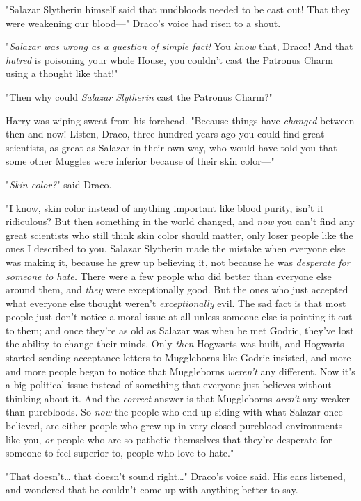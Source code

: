 "Salazar Slytherin himself said that mudbloods needed to be cast out! That they 
were weakening our blood---" Draco's voice had risen to a shout.

"\emph{Salazar was wrong as a question of simple fact!} You \emph{know} that, 
Draco! And that \emph{hatred} is poisoning your whole House, you couldn't cast 
the Patronus Charm using a thought like that!"

"Then why could \emph{Salazar Slytherin} cast the Patronus Charm?"

Harry was wiping sweat from his forehead. "Because things have \emph{changed} 
between then and now! Listen, Draco, three hundred years ago you could find 
great scientists, as great as Salazar in their own way, who would have told you 
that some other Muggles were inferior because of their skin color---"

"\emph{Skin color?}" said Draco.

"I know, skin color instead of anything important like blood purity, isn't it 
ridiculous? But then something in the world changed, and \emph{now} you can't 
find any great scientists who still think skin color should matter, only loser 
people like the ones I described to you. Salazar Slytherin made the mistake 
when everyone else was making it, because he grew up believing it, not because 
he was\emph{ desperate for someone to hate.} There were a few people who did 
better than everyone else around them, and \emph{they} were exceptionally good. 
But the ones who just accepted what everyone else thought weren't 
\emph{exceptionally} evil. The sad fact is that most people just don't notice a 
moral issue at all unless someone else is pointing it out to them; and once 
they're as old as Salazar was when he met Godric, they've lost the ability to 
change their minds. Only \emph{then} Hogwarts was built, and Hogwarts started 
sending acceptance letters to Muggleborns like Godric insisted, and more and 
more people began to notice that Muggleborns \emph{weren't} any different. Now 
it's a big political issue instead of something that everyone just believes 
without thinking about it. And the \emph{correct} answer is that Muggleborns 
\emph{aren't} any weaker than purebloods. So\emph{ now} the people who end up 
siding with what Salazar once believed, are either people who grew up in very 
closed pureblood environments like you, \emph{or} people who are so pathetic 
themselves that they're desperate for someone to feel superior to, people who 
love to hate."

"That doesn't{\ldots} that doesn't sound right{\ldots}" Draco's voice said. His 
ears listened, and wondered that he couldn't come up with anything better to 
say.

